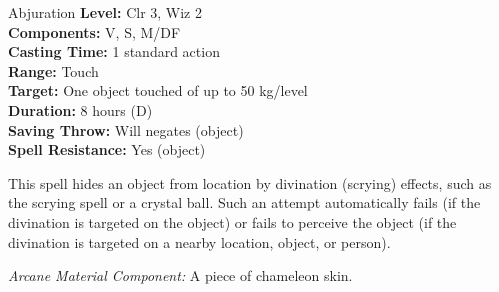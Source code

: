 {Abjuration}
{
	\textbf{Level:}
	Clr 3, Wiz 2\\
	\textbf{Components:}
	V, S, M/DF\\
	\textbf{Casting Time:}
	1 standard action\\
	\textbf{Range:}
	Touch\\
	\textbf{Target:}
	One object touched of up to 50 kg/level\\
	\textbf{Duration:}
	8 hours (D)\\
	\textbf{Saving Throw:}
	Will negates (object)\\
	\textbf{Spell Resistance:}
	Yes (object)\\
}
{
	This spell hides an object from location by divination (scrying) effects, such as the scrying spell or a crystal ball. Such an attempt automatically fails (if the divination is targeted on the object) or fails to perceive the object (if the divination is targeted on a nearby location, object, or person).

	\textit{Arcane Material Component:}
	A piece of chameleon skin.

}
